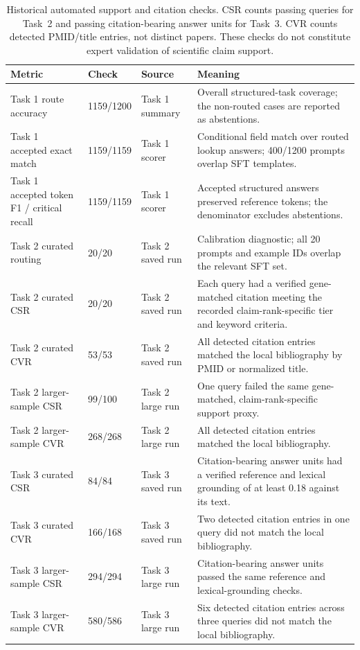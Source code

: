 \begin{table}[h!]
\centering
\scriptsize
\caption{Historical automated support and citation checks. CSR counts passing queries for Task~2 and passing citation-bearing answer units for Task~3. CVR counts detected PMID/title entries, not distinct papers. These checks do not constitute expert validation of scientific claim support.}
\label{tab:metric-audit}
\setlength{\tabcolsep}{2pt}
\renewcommand{\arraystretch}{1.08}
\begin{tabularx}{\textwidth}{P{3.0cm} P{1.8cm} P{3.0cm} Y}
\toprule
\textbf{Metric} & \textbf{Check} & \textbf{Source} & \textbf{Meaning} \\
\midrule
Task 1 route accuracy & 1159/1200 & Task 1 summary & Overall structured-task coverage; the non-routed cases are reported as abstentions. \\
Task 1 accepted exact match & 1159/1159 & Task 1 scorer & Conditional field match over routed lookup answers; 400/1200 prompts overlap SFT templates. \\
Task 1 accepted token F1 / critical recall & 1159/1159 & Task 1 scorer & Accepted structured answers preserved reference tokens; the denominator excludes abstentions. \\
Task 2 curated routing & 20/20 & Task 2 saved run & Calibration diagnostic; all 20 prompts and example IDs overlap the relevant SFT set. \\
Task 2 curated CSR & 20/20 & Task 2 saved run & Each query had a verified gene-matched citation meeting the recorded claim-rank-specific tier and keyword criteria. \\
Task 2 curated CVR & 53/53 & Task 2 saved run & All detected citation entries matched the local bibliography by PMID or normalized title. \\
Task 2 larger-sample CSR & 99/100 & Task 2 large run & One query failed the same gene-matched, claim-rank-specific support proxy. \\
Task 2 larger-sample CVR & 268/268 & Task 2 large run & All detected citation entries matched the local bibliography. \\
Task 3 curated CSR & 84/84 & Task 3 saved run & Citation-bearing answer units had a verified reference and lexical grounding of at least 0.18 against its text. \\
Task 3 curated CVR & 166/168 & Task 3 saved run & Two detected citation entries in one query did not match the local bibliography. \\
Task 3 larger-sample CSR & 294/294 & Task 3 large run & Citation-bearing answer units passed the same reference and lexical-grounding checks. \\
Task 3 larger-sample CVR & 580/586 & Task 3 large run & Six detected citation entries across three queries did not match the local bibliography. \\
\bottomrule
\end{tabularx}
\end{table}
